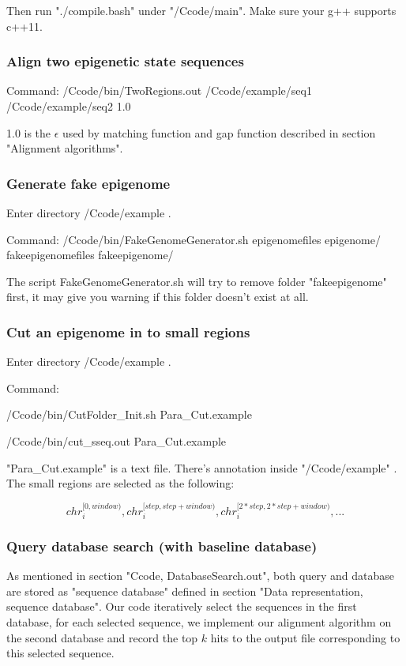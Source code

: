 \documentclass[a4paper]{article}
\begin{document}
\begin{CJK*}{UTF8}{kai}
Then run "./compile.bash" under "/Ccode/main". Make sure your g++ supports c++11.

\subsubsection{Align two epigenetic state sequences}

Command: /Ccode/bin/TwoRegions.out /Ccode/example/seq1 /Ccode/example/seq2 1.0

1.0 is the $\epsilon$ used by matching function and gap function described in section "Alignment algorithms".

\subsubsection{Generate fake epigenome}
 
Enter directory /Ccode/example .

Command: /Ccode/bin/FakeGenomeGenerator.sh epigenomefiles epigenome/ fakeepigenomefiles fakeepigenome/

The script FakeGenomeGenerator.sh will try to remove folder "fakeepigenome" first, it may give you warning if this folder doesn't exist at all.

\subsubsection{Cut an epigenome in to small regions}

Enter directory /Ccode/example .

Command: 

/Ccode/bin/CutFolder\_Init.sh Para\_Cut.example

/Ccode/bin/cut\_sseq.out Para\_Cut.example

"Para\_Cut.example" is a text file. There's annotation inside "/Ccode/example" . The small regions are selected as the following:

$$chr_i^{[0,window)}, chr_i^{[step,step+window)}, chr_i^{[2*step,2*step+window)},...$$

\subsubsection{Query database search (with baseline database)}

As mentioned in section "Ccode, DatabaseSearch.out", both query and database are stored as "sequence database" defined in section "Data representation, sequence database". Our code iteratively select the sequences in the first database, for each selected sequence, we implement our alignment algorithm on the second database and record the top $k$ hits to the output file corresponding to this selected sequence.


\end{CJK*}
\end{document}
